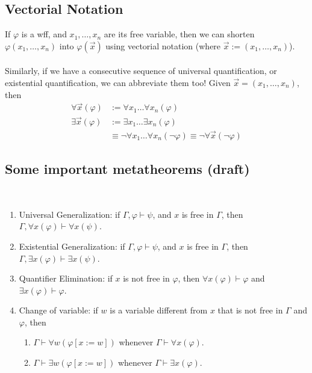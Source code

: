 \documentclass{treatise}
\begin{document}
\begin{shaded}
\subsection{Vectorial Notation}
If $\varphi$ is a wff, and $x_1, \hdots, x_n$ are its free variable, then we can shorten $\varphi(x_1, \hdots, x_n)$ into $\varphi(\vec{x})$ using vectorial notation (where $\vec{x} := (x_1, \hdots, x_n)$).
\\
\\
Similarly, if we have a consecutive sequence of universal quantification, or existential quantification, we can abbreviate them too! Given $\vec{x} = (x_1, \hdots, x_n)$, then
\begin{align*}
    \forall \vec{x} (\varphi) & := \forall x_1 \hdots \forall x_n (\varphi)
    \\
    \exists \vec{x} (\varphi) & := \exists x_1 \hdots \exists x_n (\varphi)
    \\
    & \equiv \neg \forall x_1 \hdots \forall x_n (\neg \varphi) \equiv \neg \forall \vec{x} (\neg \varphi)
\end{align*}

\subsection{Some important metatheorems (draft)}
\begin{theorem} \ 
\begin{enumerate}
	\item Universal Generalization: if $\Gamma, \varphi \vdash \psi$, and $x$ is free in $\Gamma$, then $\Gamma, \forall x (\varphi) \vdash \forall x (\psi)$.
	\item Existential Generalization: if $\Gamma, \varphi \vdash \psi$, and $x$ is free in $\Gamma$, then $\Gamma, \exists x (\varphi) \vdash \exists x (\psi)$.
	\item Quantifier Elimination: if $x$ is not free in $\varphi$, then $\forall x (\varphi) \vdash \varphi$ and $\exists x (\varphi)  \vdash \varphi$.
	\item Change of variable: if $w$ is a variable different from $x$ that is not free in $\Gamma$ and $\varphi$, then
	\begin{enumerate}
		\item $\Gamma \vdash \forall w (\varphi[x := w])$ whenever $\Gamma \vdash \forall x (\varphi)$.
		\item $\Gamma \vdash \exists w (\varphi[x := w])$ whenever $\Gamma \vdash \exists x (\varphi)$.
	\end{enumerate}
\end{enumerate}
\end{theorem}


\end{shaded}
\end{document}
